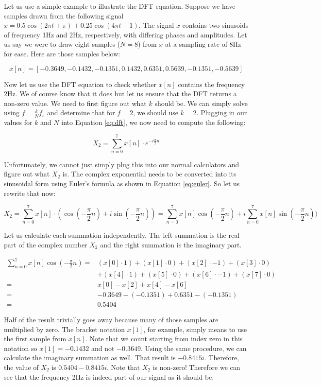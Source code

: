 Let us use a simple example to illustrate the DFT equation.  Suppose
we have samples drawn from the following signal $x = 0.5\cos(2\pi t + \pi) + 0.25\cos(4\pi t - 1)$.  The signal
$x$ contains two sinusoids of frequency 1Hz and 2Hz, respectively, with differing phases and amplitudes.  
Let us say we
were to draw eight samples ($N = 8$) from $x$ at a sampling rate of 8Hz for ease.  Here are those samples below:

$$x[n] = [-0.3649, -0.1432, -0.1351, 0.1432, 0.6351, 0.5639, -0.1351, -0.5639]$$

Now let us use the DFT equation to check whether $x[n]$ contains the frequency 2Hz.  We 
of course know that it does but let us ensure that the DFT returns a non-zero value.  We
need to first figure out what $k$ should be.  We can simply solve using $f = \frac{k}{N}f_s$ and determine that
for $f = 2$, we should use $k = 2$.  Plugging in our values for $k$ and $N$ into Equation \ref{eq:dft}, we now 
need to compute the following:

$$X_2 = \sum_{n = 0}^{7}x[n] \cdot e^{-i\frac{\pi}{2}n}$$

\noindent Unfortunately, we cannot just simply plug this into our normal calculators and figure out what $X_2$ is.  The complex exponential needs to be converted into its sinusoidal form using Euler's formula as shown in Equation
 \ref{eq:euler}.  So let us rewrite that now:

$$X_2 = \sum_{n = 0}^{7}x[n] \cdot (\cos{(-\frac{\pi}{2}n)} +  i\sin(-\frac{\pi}{2}n)) = 
\sum_{n = 0}^{7}x[n]\cos{(-\frac{\pi}{2}n)} + i\sum_{n = 0}^{7}x[n]\sin(-\frac{\pi}{2}n))$$

\noindent Let us calculate each summation independently.  The left summation is the real part of the complex number $X_2$
and the right summation is the imaginary part.  

\begin{align*}
	\sum_{n = 0}^{7}x[n]\cos{(-\frac{\pi}{2}n)} =  & (x[0] \cdot 1) + (x[1] \cdot 0) + (x[2] \cdot -1) + (x[3] \cdot 0)\\
	& + (x[4] \cdot 1) + (x[5] \cdot 0) + (x[6] \cdot -1) + (x[7] \cdot 0)\\
	=  & x[0] - x[2] + x[4] - x[6] \\
	=  & -0.3649 - (-0.1351) + 0.6351 - (-0.1351) \\
	= & 0.5404
\end{align*}

Half of the result trivially goes away because many of those samples are multiplied by zero.  The bracket notation
$x[1]$, for example, simply means to use the first sample from $x[n]$.  Note that we count starting from index zero
in this notation so $x[1] = -0.1432$ and not $-0.3649$.  Using the same procedure, we can calculate
the imaginary summation as well.  That result is $-0.8415i$.  Therefore, the value of 
$X_2$ is $0.5404 - 0.8415i$.  Note that $X_2$ is non-zero!  Therefore we can see that the frequency 2Hz is
indeed part of our signal as it should be.

